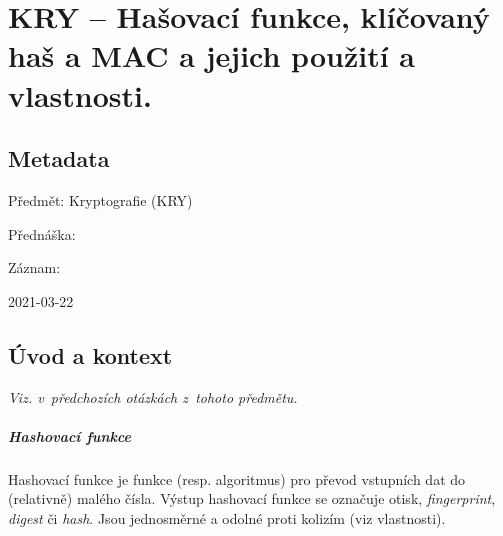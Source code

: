 

\graphicspath{{kry/hasovaci_funkce/figures}}


\chapter{KRY -- Hašovací funkce, klíčovaný haš a MAC a jejich použití a vlastnosti.}


\section{Metadata}

\begin{compactitem}
    \item Předmět: Kryptografie (KRY)
    \item Přednáška:
    \begin{compactitem}
        \item {}
    \end{compactitem}
    \item Záznam:
    \begin{compactitem}
        \item 2021-03-22
    \end{compactitem}
\end{compactitem}


\section{Úvod a kontext}

\textit{Viz.  v~předchozích otázkách z~tohoto předmětu.}

\paragraph*{Hashovací funkce} Hashovací funkce je funkce (resp. algoritmus) pro převod vstupních dat do (relativně) malého čísla. Výstup hashovací funkce se označuje otisk, \textit{fingerprint}, \textit{digest} či \textit{hash}. Jsou jednosměrné a odolné proti kolizím (viz vlastnosti).

